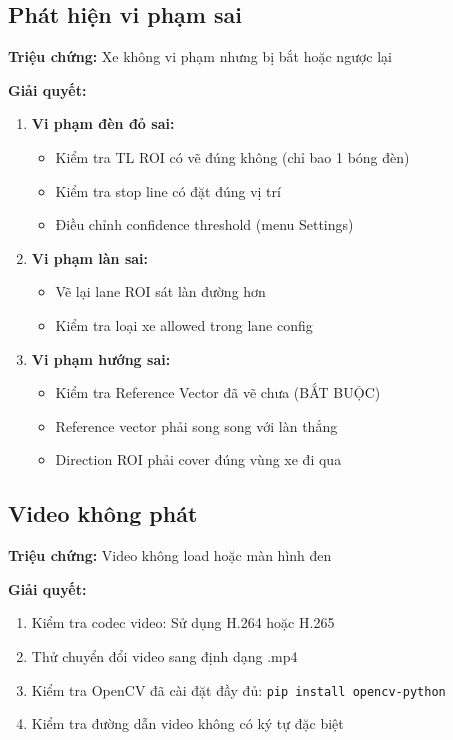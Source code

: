 \subsection{Phát hiện vi phạm sai}

\textbf{Triệu chứng:} Xe không vi phạm nhưng bị bắt hoặc ngược lại

\textbf{Giải quyết:}
\begin{enumerate}
    \item \textbf{Vi phạm đèn đỏ sai:}
    \begin{itemize}
        \item Kiểm tra TL ROI có vẽ đúng không (chỉ bao 1 bóng đèn)
        \item Kiểm tra stop line có đặt đúng vị trí
        \item Điều chỉnh confidence threshold (menu Settings)
    \end{itemize}
    \item \textbf{Vi phạm làn sai:}
    \begin{itemize}
        \item Vẽ lại lane ROI sát làn đường hơn
        \item Kiểm tra loại xe allowed trong lane config
    \end{itemize}
    \item \textbf{Vi phạm hướng sai:}
    \begin{itemize}
        \item Kiểm tra Reference Vector đã vẽ chưa (BẮT BUỘC)
        \item Reference vector phải song song với làn thẳng
        \item Direction ROI phải cover đúng vùng xe đi qua
    \end{itemize}
\end{enumerate}

\subsection{Video không phát}

\textbf{Triệu chứng:} Video không load hoặc màn hình đen

\textbf{Giải quyết:}
\begin{enumerate}
    \item Kiểm tra codec video: Sử dụng H.264 hoặc H.265
    \item Thử chuyển đổi video sang định dạng .mp4
    \item Kiểm tra OpenCV đã cài đặt đầy đủ: \texttt{pip install opencv-python}
    \item Kiểm tra đường dẫn video không có ký tự đặc biệt
\end{enumerate}

